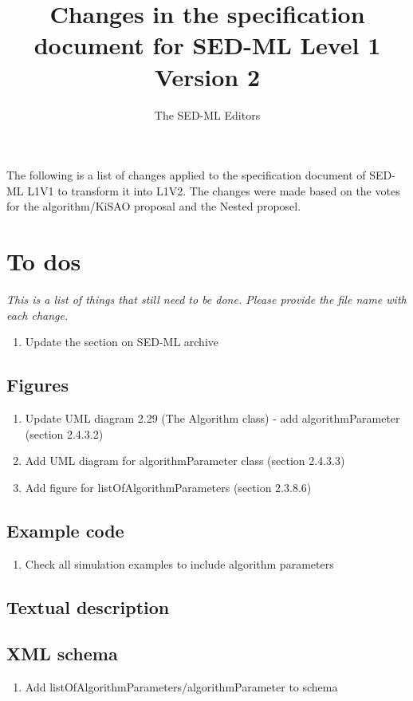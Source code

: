 \documentclass{article}
\begin{document}
\title{Changes in the specification document for SED-ML Level 1 Version 2}
\author{The SED-ML Editors}

\maketitle

The following is a list of changes applied to the specification document of SED-ML L1V1 to transform it into L1V2. The changes were made based on the votes for the algorithm/KiSAO proposal and the Nested proposel.

\section{To dos}
\emph{This is a list of things that still need to be done. Please provide the file name with each change.}

\begin{enumerate}
\item Update the section on SED-ML archive
\end{enumerate}

\subsection{Figures}
\begin{enumerate}
\item Update UML diagram 2.29 (The Algorithm class) - add algorithmParameter (section 2.4.3.2)
\item Add UML diagram for algorithmParameter class (section 2.4.3.3) 
\item Add figure for listOfAlgorithmParameters (section 2.3.8.6)
\end{enumerate}

\subsection{Example code}
\begin{enumerate}
\item Check all simulation examples to include algorithm parameters
\end{enumerate}
\subsection{Textual description}

\subsection{XML schema}
\begin{enumerate}
\item Add listOfAlgorithmParameters/algorithmParameter to schema
\end{enumerate}
\end{document}
